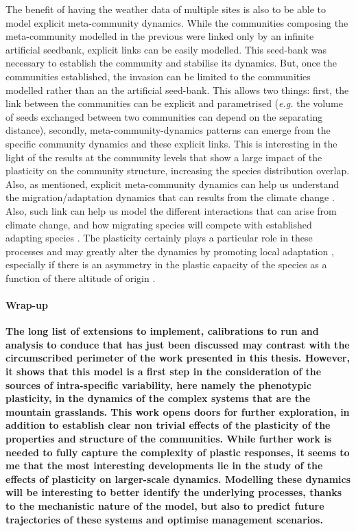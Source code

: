 The benefit of having the weather data of multiple sites is also to be able to model explicit meta-community dynamics. While the communities composing the meta-community modelled in the previous were linked only by an infinite artificial seedbank, explicit links can be easily modelled. This seed-bank was necessary to establish the community and stabilise its dynamics. But, once the communities established, the invasion can be limited to the communities modelled rather than an the artificial seed-bank. This allows two things: first, the link between the communities can be explicit and parametrised (\textit{e.g.} the volume of seeds exchanged between two communities can depend on the separating distance), secondly, meta-community-dynamics patterns can emerge from the specific community dynamics and these explicit links. This is interesting in the light of the results at the community levels that show a large impact of the plasticity on the community structure, increasing the species distribution overlap. Also, as mentioned, explicit meta-community dynamics can help us understand the migration/adaptation dynamics that can results from the climate change \parencite{morin_comparing_2009}. Also, such link can help us model the different interactions that can arise from climate change, and how migrating species will compete with established adapting species \parencite{alexander_novel_2015}. The plasticity certainly plays a particular role in these processes and may greatly alter the dynamics by promoting local adaptation \parencite{frei_plant_2014, frei_plastic_2014}, especially if there is an asymmetry in the plastic capacity of the species as a function of there altitude of origin \parencite{gugger_lower_2015, nicotra_adaptive_2015}.
%
%
%


\paragraph{Wrap-up}

\textbf{The long list of extensions to implement, calibrations to run and analysis to conduce that has just been discussed may contrast with the circumscribed perimeter of the work presented in this thesis. However, it shows that this model is a first step in the consideration of the sources of intra-specific variability, here namely the phenotypic plasticity, in the dynamics of the complex systems that are the mountain grasslands. This work opens doors for further exploration, in addition to establish clear non trivial effects of the plasticity of the properties and structure of the communities. While further work is needed to fully capture the complexity of plastic responses, it seems to me that the most interesting developments lie in the study of the effects of plasticity on larger-scale dynamics. Modelling these dynamics will be interesting to better identify the underlying processes, thanks to the mechanistic nature of the model, but also to predict future trajectories of these systems and optimise management scenarios.}

